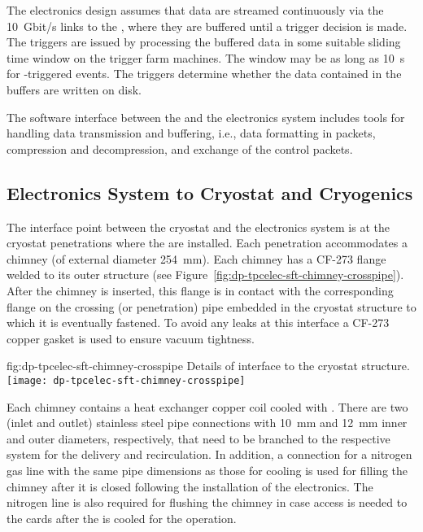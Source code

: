 The  electronics design assumes that data are streamed continuously via the \SI{10}{Gbit/s} links to the , where they are buffered until a trigger decision is made. The triggers are issued by processing the buffered data in some suitable sliding time window on the trigger farm machines. The window may be as long as \SI{10}{s} for -triggered events. The triggers determine whether the data contained in the buffers are written on disk. 

The software interface between the  and the electronics system includes tools for handling data transmission and buffering, i.e.,  data formatting in  packets, compression and decompression, and exchange of the control packets.

\subsection{Electronics System to Cryostat and Cryogenics}
\label{ssec:dp-tpcelec-intfc-cryo}

The interface point between the cryostat and the \dual electronics system is at the cryostat penetrations where the  are installed. Each penetration accommodates a chimney (of external diameter \SI{254}{\mm}). Each chimney has a CF-273 flange welded to its outer structure (see Figure~\ref{fig:dp-tpcelec-sft-chimney-crosspipe}). After the chimney is inserted, this flange is in contact with the corresponding flange on the crossing (or penetration) pipe embedded in the cryostat structure to which it is eventually fastened. To avoid any leaks at this interface a CF-273 copper gasket is used to ensure vacuum tightness.  

\begin{dunefigure}{fig:dp-tpcelec-sft-chimney-crosspipe}
{Details of  interface to the cryostat structure.}
\texttt{[image: dp-tpcelec-sft-chimney-crosspipe]}
\end{dunefigure}

Each chimney contains a heat exchanger copper coil cooled with \lar. There are two (inlet and outlet) stainless steel pipe connections with \SI{10}{\mm} and \SI{12}{\mm} inner and outer diameters, respectively, that need to be branched to the respective system for the \lar delivery and recirculation.  In addition, a connection for a nitrogen gas line with the same pipe dimensions as those for \lar cooling is used for filling the chimney after it is closed following the installation of the  electronics. The nitrogen line is also required for flushing the chimney in case access is needed to the  cards after the  is cooled for the operation. 

